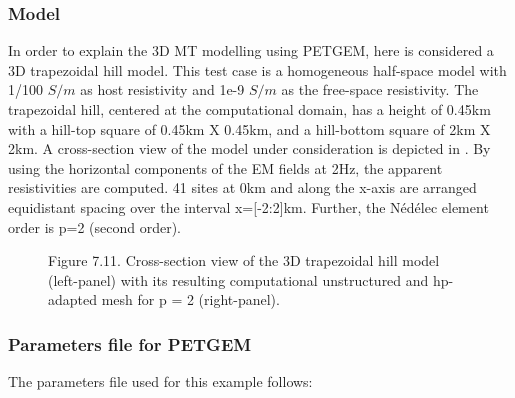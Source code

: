 \documentclass[letterpaper,10pt,english]{sphinxmanual}
\begin{document}
\subsubsection{Model}
\label{\detokenize{Manual:id12}}
In order to explain the 3D MT modelling using PETGEM, here is considered a 3D
trapezoidal hill model. This test case is a homogeneous half-space model with
1/100 \(S/m\) as host resistivity and 1e-9 \(S/m\) as the free-space
resistivity. The trapezoidal hill, centered at the computational domain, has a
height of 0.45km with a hill-top square of 0.45km X 0.45km,
and a hill-bottom square of 2km X 2km. A cross-section view of
the model under consideration is depicted in {\hyperref[\detokenize{Manual:figure-7-11}]{}}. By using the
horizontal components of the EM fields at 2Hz, the apparent resistivities are
computed. 41 sites at 0km and along the x-axis are arranged equidistant
spacing over the interval x={[}-2:2{]}km. Further, the Nédélec element order
is p=2 (second order).

\begin{figure}[htbp]
\centering
\capstart

\noindent{}
\caption{Figure 7.11. Cross-section view of the 3D trapezoidal hill model (left-panel) with its resulting computational unstructured and hp-adapted mesh for p = 2 (right-panel).}\label{\detokenize{Manual:id24}}\label{\detokenize{Manual:figure-7-11}}\end{figure}


\subsubsection{Parameters file for PETGEM}
\label{\detokenize{Manual:id13}}
The parameters file used for this example follows:
\end{document}
